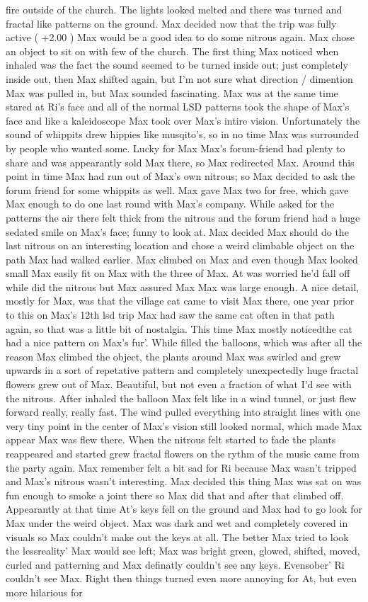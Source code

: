 \documentclass[12pt]{book}
\begin{document}
fire outside of the church. The lights looked melted and there was turned and fractal like patterns on the ground. Max decided now that the trip was fully active ( +2.00 ) Max would be a good idea to do some nitrous again. Max chose an object to sit on with few of the church. The first thing Max noticed when inhaled was the fact the sound seemed to be turned inside out; just completely inside out, then Max shifted again, but I'm not sure what direction / dimention Max was pulled in, but Max sounded fascinating. Max was at the same time stared at Ri's face and all of the normal LSD patterns took the shape of Max's face and like a kaleidoscope Max took over Max's intire vision. Unfortunately the sound of whippits drew hippies like musqito's, so in no time Max was surrounded by people who wanted some. Lucky for Max Max's forum-friend had plenty to share and was appearantly sold Max there, so Max redirected Max. Around this point in time Max had run out of Max's own nitrous; so Max decided to ask the forum friend for some whippits as well. Max gave Max two for free, which gave Max enough to do one last round with Max's company. While asked for the patterns the air there felt thick from the nitrous and the forum friend had a huge sedated smile on Max's face; funny to look at. Max decided Max should do the last nitrous on an interesting location and chose a weird climbable object on the path Max had walked earlier. Max climbed on Max and even though Max looked small Max easily fit on Max with the three of Max. At was worried he'd fall off while did the nitrous but Max assured Max Max was large enough. A nice detail, mostly for Max, was that the village cat came to visit Max there, one year prior to this on Max's 12th lsd trip Max had saw the same cat often in that path again, so that was a little bit of nostalgia. This time Max mostly noticedthe cat had a nice pattern on Max's fur'. While filled the balloons, which was after all the reason Max climbed the object, the plants around Max was swirled and grew upwards in a sort of repetative pattern and completely unexpectedly huge fractal flowers grew out of Max. Beautiful, but not even a fraction of what I'd see with the nitrous. After inhaled the balloon Max felt like in a wind tunnel, or just flew forward really, really fast. The wind pulled everything into straight lines with one very tiny point in the center of Max's vision still looked normal, which made Max appear Max was flew there. When the nitrous felt started to fade the plants reappeared and started grew fractal flowers on the rythm of the music came from the party again. Max remember felt a bit sad for Ri because Max wasn't tripped and Max's nitrous wasn't interesting. Max decided this thing Max was sat on was fun enough to smoke a joint there so Max did that and after that climbed off. Appearantly at that time At's keys fell on the ground and Max had to go look for Max under the weird object. Max was dark and wet and completely covered in visuals so Max couldn't make out the keys at all. The better Max tried to look the lessreality' Max would see left; Max was bright green, glowed, shifted, moved, curled and patterning and Max definatly couldn't see any keys. Evensober' Ri couldn't see Max. Right then things turned even more annoying for At, but even more hilarious for 
\end{document}
